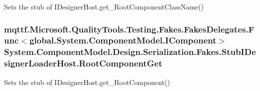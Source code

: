 Sets the stub of I\-Designer\-Host.\-get\-\_\-\-Root\-Component\-Class\-Name()

\hypertarget{class_system_1_1_component_model_1_1_design_1_1_serialization_1_1_fakes_1_1_stub_i_designer_loader_host_a815e551726e202cd2d7515b071f060e1}{
\subsubsection[{Root\-Component\-Get}]{\setlength{\rightskip}{0pt plus 5cm}mqttf.\-Microsoft.\-Quality\-Tools.\-Testing.\-Fakes.\-Fakes\-Delegates.\-Func$<$global.\-System.\-Component\-Model.\-I\-Component$>$ System.\-Component\-Model.\-Design.\-Serialization.\-Fakes.\-Stub\-I\-Designer\-Loader\-Host.\-Root\-Component\-Get}}\label{class_system_1_1_component_model_1_1_design_1_1_serialization_1_1_fakes_1_1_stub_i_designer_loader_host_a815e551726e202cd2d7515b071f060e1}


Sets the stub of I\-Designer\-Host.\-get\-\_\-\-Root\-Component()

